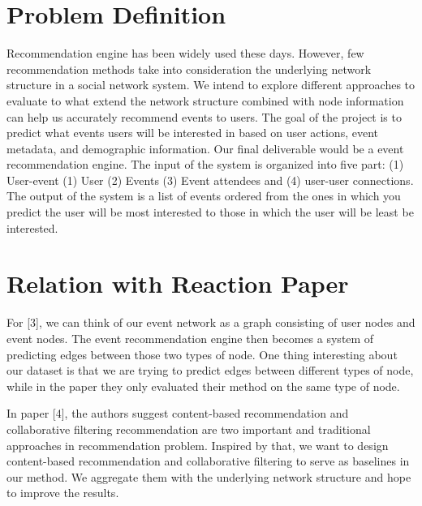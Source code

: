 \documentclass{article}
\begin{document}
\section{Problem Definition}
Recommendation engine has been widely used these days. However, few recommendation methods take into consideration the underlying network structure in a social network system. We intend to explore different approaches to evaluate to what extend the network structure combined with node information can help us accurately recommend events to users.
The goal of the project is to predict what events users will be interested in based on user actions, event metadata, and demographic information. Our final deliverable would be a event recommendation engine. The input of the system is organized into five part: (1) User-event (1) User (2) Events (3) Event attendees and (4) user-user connections. The output of the system is a list of events ordered from the ones in which you predict the user will be most interested to those in which the user will be least be interested.


\section{Relation with Reaction Paper}
For [3], we can think of our event network as a graph consisting of user nodes and event nodes. The event recommendation engine then becomes a system of predicting edges between those two types of node. One thing interesting about our dataset is that we are trying to predict edges between different types of node, while in the paper they only evaluated their method on the same type of node. 

In paper [4], the authors suggest content-based recommendation and collaborative filtering recommendation are two important and traditional approaches in recommendation problem. Inspired by that, we want to design content-based recommendation and collaborative filtering to serve as baselines in our method. We aggregate them with the underlying network structure and hope to improve the results.
\end{document}
